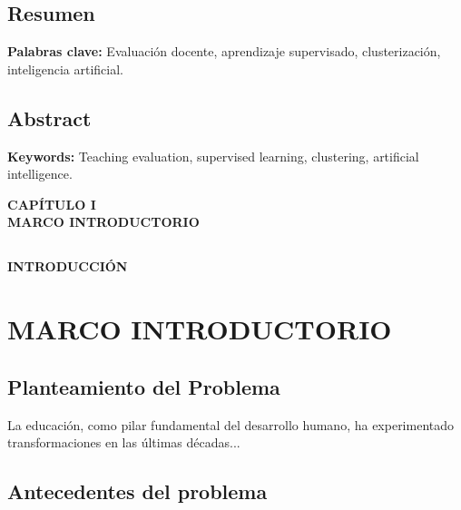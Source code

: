 \documentclass[11pt,oneside,letterpaper]{book}
\begin{document}
\newpage
{} %
\section*{Resumen}
\lipsum[1]

\bigskip
\noindent \textbf{Palabras clave:} Evaluación docente, aprendizaje supervisado, clusterización, inteligencia artificial.

\newpage
\section*{Abstract}
\lipsum[1]

\bigskip
\noindent \textbf{Keywords:} Teaching evaluation, supervised learning, clustering, artificial intelligence.

\newpage
{}
\thispagestyle{empty}
\vspace*{0.35\textheight}
\begin{center}
	{\Huge\textbf{CAPÍTULO I}} \\[0.5cm]
	{\Huge\textbf{MARCO INTRODUCTORIO}}
\end{center}
\newpage
\thispagestyle{fancy}

\section*{}
\begin{center}
	\Large \textbf{INTRODUCCIÓN}
\end{center}

\chapter{MARCO INTRODUCTORIO}
\thispagestyle{fancy}

\section{Planteamiento del Problema}
La educación, como pilar fundamental del desarrollo humano, ha experimentado transformaciones en las últimas décadas...

\section{Antecedentes del problema}
\lipsum[1]
\end{document}
